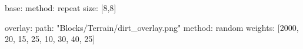 base:
  method: repeat
  size: [8,8]

overlay:
  path: "Blocks/Terrain/dirt_overlay.png"
  method: random
  weights: [2000, 20, 15, 25, 10, 30, 40, 25]
